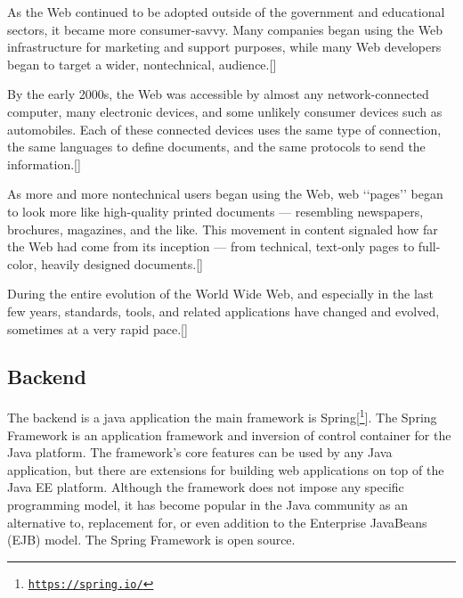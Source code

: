 As the Web continued to be adopted outside of the government and educational sectors, it
became more consumer-savvy. Many companies began using the Web infrastructure for marketing
and support purposes, while many Web developers began to target a wider, nontechnical,
audience.[\cite{7}]
\newline

By the early 2000s, the Web was accessible by almost any network-connected computer, many
electronic devices, and some unlikely consumer devices such as automobiles. Each of these connected
devices uses the same type of connection, the same languages to define documents, and
the same protocols to send the information.[\cite{7}]
\newline

As more and more nontechnical users began using the Web, web ‘‘pages’’ began to look more
like high-quality printed documents — resembling newspapers, brochures, magazines, and the
like. This movement in content signaled how far the Web had come from its inception — from
technical, text-only pages to full-color, heavily designed documents.[\cite{7}]
\newline

During the entire evolution of the World Wide Web, and especially in the last few years, standards,
tools, and related applications have changed and evolved, sometimes at a very rapid pace.[\cite{7}]

\subsection{Backend}

The backend is a java application the main framework is Spring[\footnote{\href{https://spring.io/}{\texttt{https://spring.io/}}}].
The Spring Framework is an application framework and inversion of control container for the Java platform. The framework's core features can be used by any Java application, but there are extensions for building web applications on top of the Java EE platform. Although the framework does not impose any specific programming model, it has become popular in the Java community as an alternative to, replacement for, or even addition to the Enterprise JavaBeans (EJB) model. The Spring Framework is open source.
\newline
